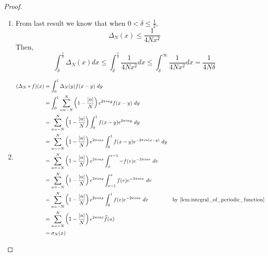 \begin{proof}
\begin{enumerate}[label=(\alph*)]
      
     \item
       From last result we know that when $0< \delta \le \frac{1}{2}$, $$\Delta_N(x) \le \frac{1}{4Nx^2}$$
       Then,
        \begin{displaymath}
          \int_\delta^\frac{1}{2} \Delta_N(x) dx \le \int_\delta^\frac{1}{2} \frac{1}{4Nx^2} dx \le \int_\delta^\infty \frac{1}{4Nx^2} dx = \frac{1}{4N\delta}
        \end{displaymath}

    \item
      \begin{align*}
        (\Delta_N*f)(x) &= \int_0^1 \Delta_N(y)f(x-y) \ dy \\
              &= \int_0^1 \sum_{n=-N}^{N} \left(1-\frac{\abs{n}}{N}\right)e^{2\pi iny} f(x-y) \ dy \\
              &= \sum_{n=-N}^N  \left(1-\frac{\abs{n}}{N}\right) \int_0^1 f(x-y) e^{2\pi iny} \ dy \\
              &= \sum_{n=-N}^N  \left(1-\frac{\abs{n}}{N}\right) e^{2 \pi inx}  \int_0^1 f(x-y) e^{-2\pi in \left( x-y \right) } \ dy \\
              &= \sum_{n=-N}^N  \left(1-\frac{\abs{n}}{N}\right) e^{2 \pi inx} \int_x^{x-1} -f(v) e^{-2\pi in v} \ dv \\
              &= \sum_{n=-N}^N  \left(1-\frac{\abs{n}}{N}\right) e^{2 \pi inx} \int_{x-1}^x f(v) e^{-2\pi in v} \ dv \\
              &= \sum_{n=-N}^N  \left(1-\frac{\abs{n}}{N}\right) e^{2 \pi inx} \int_0^{1} f(v) e^{-2\pi in v} \ dv & \text{by \autoref{lem:integral_of_periodic_function}}\\
              &= \sum_{n=-N}^N  \left(1-\frac{\abs{n}}{N}\right) e^{2 \pi inx} \hatf(n) \\
              &= \sigma_N(x)
      \end{align*}
    \end{enumerate}
\end{proof}
  

